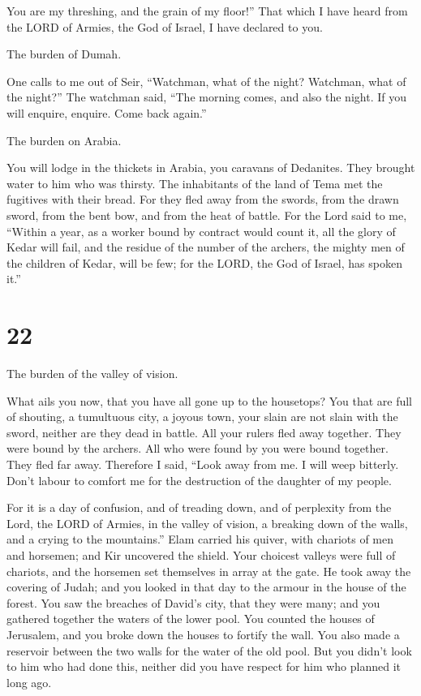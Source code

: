  You are my threshing, and the grain of my floor!'' That
which I have heard from the LORD of Armies, the God of Israel, I have
declared to you.

 The burden of Dumah.

One calls to me out of Seir, ``Watchman, what of the night? Watchman,
what of the night?''  The watchman said, ``The morning
comes, and also the night. If you will enquire, enquire. Come back
again.''

 The burden on Arabia.

You will lodge in the thickets in Arabia, you caravans of Dedanites.
 They brought water to him who was thirsty. The
inhabitants of the land of Tema met the fugitives with their bread.
 For they fled away from the swords, from the drawn
sword, from the bent bow, and from the heat of battle. 
For the Lord said to me, ``Within a year, as a worker bound by contract
would count it, all the glory of Kedar will fail,  and
the residue of the number of the archers, the mighty men of the children
of Kedar, will be few; for the LORD, the God of Israel, has spoken it.''

\hypertarget{section-21}{%
\section{22}\label{section-21}}

 The burden of the valley of vision.

What ails you now, that you have all gone up to the housetops?
 You that are full of shouting, a tumultuous city, a
joyous town, your slain are not slain with the sword, neither are they
dead in battle.  All your rulers fled away together. They
were bound by the archers. All who were found by you were bound
together. They fled far away.  Therefore I said, ``Look
away from me. I will weep bitterly. Don't labour to comfort me for the
destruction of the daughter of my people.

 For it is a day of confusion, and of treading down, and
of perplexity from the Lord, the LORD of Armies, in the valley of
vision, a breaking down of the walls, and a crying to the mountains.''
 Elam carried his quiver, with chariots of men and
horsemen; and Kir uncovered the shield.  Your choicest
valleys were full of chariots, and the horsemen set themselves in array
at the gate.  He took away the covering of Judah; and you
looked in that day to the armour in the house of the forest.
 You saw the breaches of David's city, that they were
many; and you gathered together the waters of the lower pool.
 You counted the houses of Jerusalem, and you broke down
the houses to fortify the wall.  You also made a
reservoir between the two walls for the water of the old pool. But you
didn't look to him who had done this, neither did you have respect for
him who planned it long ago.

